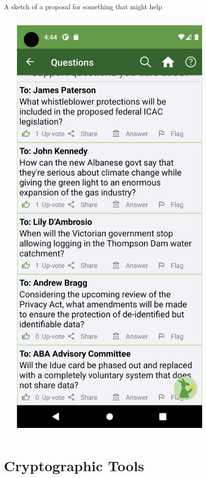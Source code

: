 \documentclass[10pt,xcolor=svgnames,169]{beamer} %
\begin{document}
\begin{frame}[fragile]{A sketch of a proposal for something that might help}
\begin{columns}
\begin{column}{0.5\textwidth}
	
		\end{column}
		\begin{column}{0.4\textwidth}  %
				\includegraphics[width=0.8\textwidth]{Screenshot}
		\end{column}
	\end{columns}
		
	\end{frame}
	
	\section{Cryptographic Tools}
	
\end{document}
